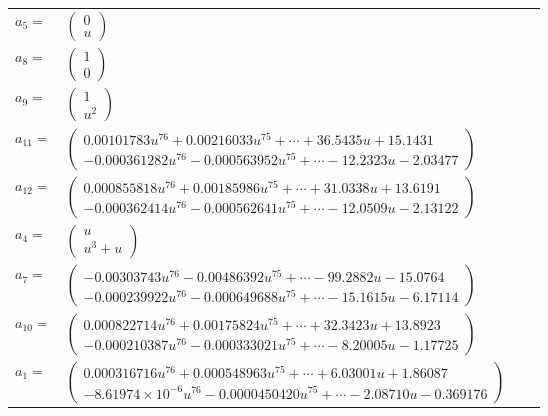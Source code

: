 \documentclass[1p]{elsarticle_modified}
\theoremstyle{definition}
\begin{document}
\begin{tabular}{m{7pt} m{180pt} m{7pt} m{180pt} }
\flushright $a_{5}=$&$\begin{pmatrix}0\\u\end{pmatrix}$ \\
\flushright $a_{8}=$&$\begin{pmatrix}1\\0\end{pmatrix}$ \\
\flushright $a_{9}=$&$\begin{pmatrix}1\\u^2\end{pmatrix}$ \\
\flushright $a_{11}=$&$\begin{pmatrix}0.00101783 u^{76}+0.00216033 u^{75}+\cdots+36.5435 u+15.1431\\-0.000361282 u^{76}-0.000563952 u^{75}+\cdots-12.2323 u-2.03477\end{pmatrix}$ \\
\flushright $a_{12}=$&$\begin{pmatrix}0.000855818 u^{76}+0.00185986 u^{75}+\cdots+31.0338 u+13.6191\\-0.000362414 u^{76}-0.000562641 u^{75}+\cdots-12.0509 u-2.13122\end{pmatrix}$ \\
\flushright $a_{4}=$&$\begin{pmatrix}u\\u^3+u\end{pmatrix}$ \\
\flushright $a_{7}=$&$\begin{pmatrix}-0.00303743 u^{76}-0.00486392 u^{75}+\cdots-99.2882 u-15.0764\\-0.000239922 u^{76}-0.000649688 u^{75}+\cdots-15.1615 u-6.17114\end{pmatrix}$ \\
\flushright $a_{10}=$&$\begin{pmatrix}0.000822714 u^{76}+0.00175824 u^{75}+\cdots+32.3423 u+13.8923\\-0.000210387 u^{76}-0.000333021 u^{75}+\cdots-8.20005 u-1.17725\end{pmatrix}$ \\
\flushright $a_{1}=$&$\begin{pmatrix}0.000316716 u^{76}+0.000548963 u^{75}+\cdots+6.03001 u+1.86087\\-8.61974\times10^{-6} u^{76}-0.0000450420 u^{75}+\cdots-2.08710 u-0.369176\end{pmatrix}$ \\

\end{tabular}
\end{document}
